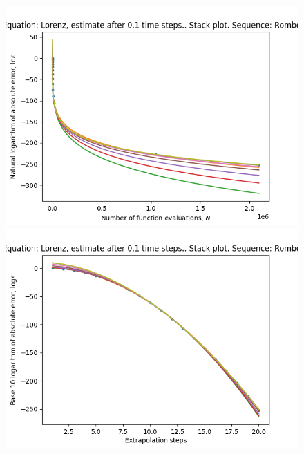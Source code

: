 \begin{figure}[H]
\centering
\begin{minipage}{0.45\textwidth}
\centering
\includegraphics[scale=0.45]{../results/emr_plots/lorenz_hp_romberg_stack.png}
\end{minipage}
\begin{minipage}{0.45\textwidth}
\centering
\includegraphics[scale=0.45]{../results/emr_plots/lorenz_hp_romberg_steps_stack.png}
\end{minipage}
\end{figure}

